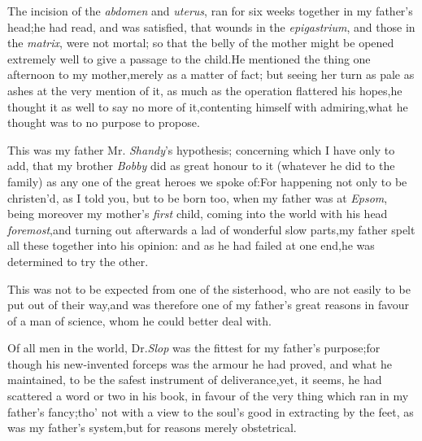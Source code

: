 \documentclass{article}
\begin{document}
The incision of the \textit{abdomen} and \textit{ute\-rus},
ran for six weeks together in my father’s
head;\tsk he had read, and was satisfied, that wounds in
the \textit{epigastrium}, and those in the \textit{matrix}, were not
mortal;\tsk\break
so that the belly of the mother might be
opened extremely well to give a passage to the child.\tsk He mentioned the thing one
afternoon to my mother,\tsk merely as a matter of fact; but seeing her turn as pale
as ashes at the very mention of it, as much as the operation flattered his
hopes,\tsk he thought it as well to say no more of it,\tsk contenting himself with
admiring,\tsk what he thought was to no purpose to propose.

This was my father Mr. \textit{Shandy}’s hypothesis; concerning
which I have only to add, that my brother \textit{Bobby} did as
great honour to it (whatever he did to the family) as any one of
the great heroes we spoke of:\tsk For happening not only to be
christen’d, as I told you, but to be born too, when my father
was at \textit{Epsom},\tsk\break
being moreover my mother’s \textit{first} child,\break
\tsk coming into the world with his head
\textit{foremost},\tsk and turning out afterwards a lad of
wonderful slow parts,\tsh my father spelt all these together
into his opinion: and as he had failed at one end,\tsk he was
determined to try the other.

This was not to be expected from one of the sisterhood, who are
not easily to be put out of their way,\tsh and was
therefore one of my father’s great reasons in favour of a man
of science, whom he could better deal with.

Of all men in the world, Dr.\@ \textit{Slop} was the fittest for my
father’s purpose;\tsh for though his new-invented
forceps was the armour he had proved, and what he maintained, to be
the safest instrument of deliverance,\tsk yet, it seems, he had
scattered a word or two in his book, in favour of the very thing
which ran in my father’s fancy;\tsh tho’ not
with a view to the soul’s good in extracting by the feet, as
was my father’s system,\tsk but for reasons merely
obstetrical.
\end{document}
